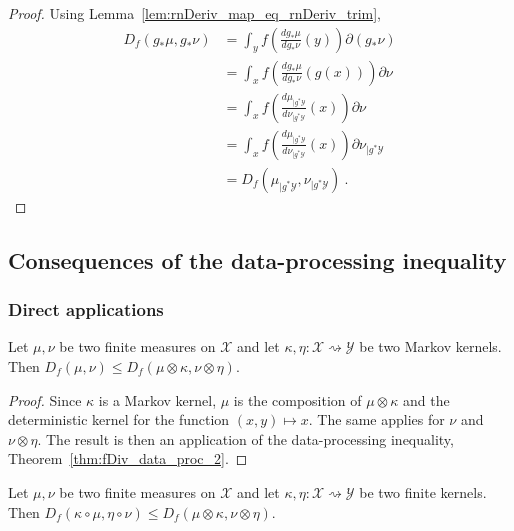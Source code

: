 \begin{proof}\leanok
{}
Using Lemma~\ref{lem:rnDeriv_map_eq_rnDeriv_trim},
\begin{align*}
D_f(g_* \mu, g_* \nu)
&= \int_y f \left( \frac{d g_*\mu}{d g_*\nu}(y)\right) \partial(g_*\nu)
\\
&= \int_x f \left( \frac{d g_*\mu}{d g_*\nu}(g(x))\right) \partial\nu
\\
&= \int_x f \left(\frac{d \mu_{| g^* \mathcal Y}}{d \nu_{| g^* \mathcal Y}}(x) \right) \partial\nu
\\
&= \int_x f \left(\frac{d \mu_{| g^* \mathcal Y}}{d \nu_{| g^* \mathcal Y}}(x) \right) \partial\nu_{| g^* \mathcal Y}
\\
&= D_f(\mu_{| g^* \mathcal Y}, \nu_{| g^* \mathcal Y})
\: .
\end{align*}
\end{proof}



\subsection{Consequences of the data-processing inequality}

\subsubsection{Direct applications}

\begin{theorem}
  \label{thm:fDiv_le_compProd_2}
  \leanok
  Let $\mu, \nu$ be two finite measures on $\mathcal X$ and let $\kappa, \eta : \mathcal X \rightsquigarrow \mathcal Y$ be two Markov kernels.
  Then $D_f(\mu, \nu) \le D_f(\mu \otimes \kappa, \nu \otimes \eta)$.
\end{theorem}

\begin{proof}\leanok
{}
Since $\kappa$ is a Markov kernel, $\mu$ is the composition of $\mu \otimes \kappa$ and the deterministic kernel for the function $(x,y) \mapsto x$. The same applies for $\nu$ and $\nu \otimes \eta$.
The result is then an application of the data-processing inequality, Theorem~\ref{thm:fDiv_data_proc_2}.
\end{proof}


\begin{theorem}
  \label{thm:fDiv_comp_le_compProd_2}
  \leanok
  Let $\mu, \nu$ be two finite measures on $\mathcal X$ and let $\kappa, \eta : \mathcal X \rightsquigarrow \mathcal Y$ be two finite kernels.
  Then $D_f(\kappa \circ \mu, \eta \circ \nu) \le D_f(\mu \otimes \kappa, \nu \otimes \eta)$.
\end{theorem}

